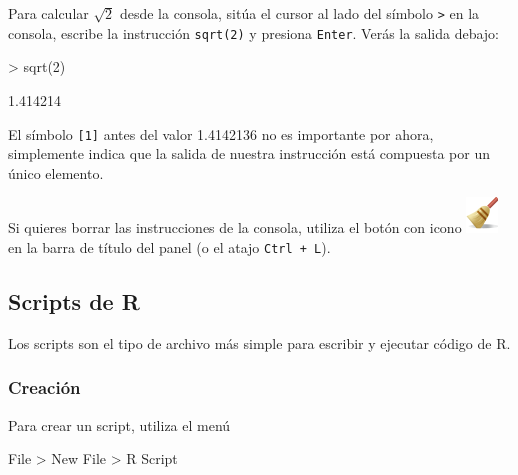 \documentclass[
  title=normal,
  notoc,
  bib=normal]{mnye}
\newenvironment{Shaded}{\begin{snugshade}}{\end{snugshade}}
\newcommand{\NormalTok}[1]{#1}
\begin{document}
Para calcular \(\sqrt{2}\) desde la consola, sitúa el cursor al lado del símbolo \texttt{\textgreater{}} en la consola, escribe la instrucción \texttt{sqrt(2)} y presiona \texttt{Enter}. Verás la salida debajo:

\begin{Shaded}
\begin{Highlighting}[]
\NormalTok{\textgreater{} sqrt(2)}
\end{Highlighting}
\end{Shaded}

\begin{Shaded}
\begin{Highlighting}[]
\NormalTok{[1] 1.414214}
\end{Highlighting}
\end{Shaded}

El símbolo \texttt{{[}1{]}} antes del valor 1.4142136 no es importante por ahora, simplemente indica que la salida de nuestra instrucción está compuesta por un único elemento.

\href{https://drive.google.com/uc?id=19pAbIq8TgtW6IjycuPj9UT1J_8U_vMOO&export=view}{\faVideoCamera}

\begin{infobox}
Si quieres borrar las instrucciones de la consola, utiliza el botón con icono \includegraphics{images/clear.png} en la barra de título del panel (o el atajo \texttt{Ctrl\ +\ L}).

\end{infobox}

\hypertarget{scripts-de-r}{%
\subsection{Scripts de R}\label{scripts-de-r}}

Los scripts son el tipo de archivo más simple para escribir y ejecutar código de \textsf{R}.

\hypertarget{creaciuxf3n}{%
\subsubsection{Creación}\label{creaciuxf3n}}

Para crear un script, utiliza el menú

\begin{menu}
File \textgreater{} New File \textgreater{} R Script

\end{menu}
\end{document}
